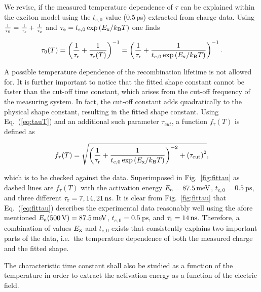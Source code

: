 We revise, if the measured temperature dependence of $\tau$ can be explained within the exciton model
 using the $t_{e,0}$-value (0.5\,ps) extracted from charge data. 
Using $\frac{1}{\tau_{0}} =  \frac{1}{\tau_\textrm{r}} + \frac{1}{\tau_\textrm{e}}$ and $\tau_\textrm{e} = t_{e,0} \exp{\left( E_{\textrm{x}}/k_{\textrm{B}}T \right)}$ one finds

\begin{equation}
 \tau_{0}(T) = \left( \frac{1}{\tau_\textrm{r}} + \frac{1}{\tau_\textrm{e}(T)} \right)^{-1} = \left( \frac{1}{\tau_\textrm{r}} + \frac{1}{t_{e,0} \exp{\left( E_{\textrm{x}}/k_{\textrm{B}}T \right)} }\right)^{-1}.
 \label{eq:tauT}
\end{equation}

\noindent
A possible temperature dependence of the recombination lifetime is not allowed for. 
It is further important to notice that
 the fitted shape constant cannot be faster than the cut-off time constant, which arises from the cut-off frequency of the measuring system. 
In fact, the cut-off constant adds quadratically to the physical shape constant, resulting in the fitted shape constant.
Using Eq.~(\ref{eq:tauT}) and an additional such parameter $\tau_{cut}$, a function $f_{\tau}(T)$ is defined  as

\begin{equation}
 f_{\tau}(T) = \sqrt{\left( \frac{1}{\tau_\textrm{r}} + \frac{1}{t_{e,0} \exp{\left( E_{\textrm{x}}/k_{\textrm{B}}T \right)} }\right)^{-2} + \left( \tau_{\textrm{cut}}\right)^2},
 \label{eq:fittau}
\end{equation}

\noindent
which is to be checked against the data. 
Superimposed in Fig.~\ref{fig:fittau} as dashed lines are $f_{\tau}(T)$ with the activation energy $\Ea = \SI{87.5}{\milli\eV}$, $t_{e,0} = \SI{0.5}{\ps}$,
 and three different $\tau_\textrm{r} = 7,14,\SI{21}{\nano\second}$. 
It is clear from Fig.~\ref{fig:fittau} that Eq.~(\ref{eq:fittau}) describes the experimental data reasonably well
 using the afore mentioned $\Ea(\SI{500}{\volt}) = \SI{87.5}{\milli\eV}$, $t_{e,0} = \SI{0.5}{\ps}$, and $\taurec = \SI{14}{\ns}$. 
Therefore, a combination of values $E_{\textrm{x}}$ and $t_{e,0}$ exists that consistently explains two important parts of the data,
 i.e.~the temperature dependence of both the measured charge and the fitted shape. 

The characteristic time constant shall also be studied as a function of the temperature in order to extract the activation energy as a function of the electric field. 

